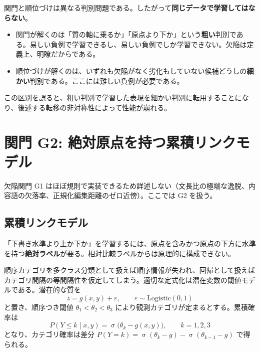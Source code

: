 \documentclass[a4paper,10.5pt]{ltjsarticle}
\newcommand{\sg}{\operatorname{\sigma}}
\begin{document}
\begin{keybox}[title=データ配分の原則]
関門と順位づけは異なる判別問題である。したがって\textbf{同じデータで学習してはならない}。

\begin{itemize}
  \item 関門が解くのは「質の軸に乗るか」「原点より下か」という\textbf{粗い}判別である。易しい負例で学習できるし、易しい負例でしか学習できない。欠陥は定義上、明瞭だからである。
  \item 順位づけが解くのは、いずれも欠陥がなく劣化もしていない候補どうしの\textbf{細かい}判別である。ここには難しい負例が必要である。
\end{itemize}

この区別を誤ると、粗い判別で学習した表現を細かい判別に転用することになり、後述する転移の非対称性によって性能が崩れる。
\end{keybox}

\section{関門 G2: 絶対原点を持つ累積リンクモデル}

欠陥関門 G1 はほぼ規則で実装できるため詳述しない（文長比の極端な逸脱、内容語の欠落率、正規化編集距離のゼロ近傍）。ここでは G2 を扱う。

\subsection{累積リンクモデル}

「下書き水準より上か下か」を学習するには、原点を含みかつ原点の下方に水準を持つ\textbf{絶対ラベル}が要る。相対比較ラベルからは原理的に構成できない。

順序カテゴリを多クラス分類として扱えば順序情報が失われ、回帰として扱えばカテゴリ間隔の等間隔性を仮定してしまう。適切な定式化は潜在変数の閾値モデルである。潜在的な質を
\begin{equation}
  z = g(x,y) + \varepsilon, \qquad \varepsilon \sim \mathrm{Logistic}(0,1)
  \label{eq:latent}
\end{equation}
と置き、順序つき閾値 $\theta_1 < \theta_2 < \theta_3$ により観測カテゴリが定まるとする。累積確率は
\begin{equation}
  P(Y \le k \mid x,y) = \sg\!\bigl(\theta_k - g(x,y)\bigr), \qquad k = 1,2,3
  \label{eq:cumlink}
\end{equation}
となり、カテゴリ確率は差分 $P(Y=k) = \sg(\theta_k - g) - \sg(\theta_{k-1} - g)$ で得られる。
\end{document}
